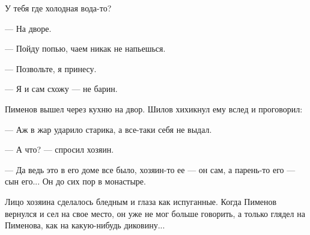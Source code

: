 У тебя где холодная вода-то?

--- На дворе.

--- Пойду попью, чаем никак не напьешься.

--- Позвольте, я принесу.

--- Я и сам схожу --- не барин.

Пименов вышел через кухню на двор. Шилов хихикнул ему вслед и проговорил:

--- Аж в жар ударило старика, а все-таки себя не выдал.

--- А что? --- спросил хозяин.

--- Да ведь это в его доме все было, хозяин-то ее --- он сам, а парень-то его --- сын его... Он до сих пор в монастыре.

Лицо хозяина сделалось бледным и глаза как испуганные. Когда Пименов вернулся и сел на свое место, он уже не мог больше говорить, а только глядел на Пименова, как на какую-нибудь диковину...
